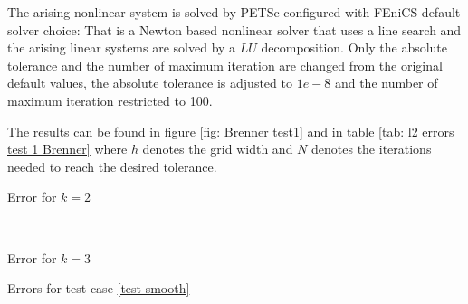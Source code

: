The arising nonlinear system is solved by PETSc configured with FEniCS default solver choice: That is a Newton based nonlinear solver that uses a line search and the arising linear systems are solved by a $LU$ decomposition.
Only the absolute tolerance and the number of maximum iteration are changed from the original default values, the absolute tolerance is adjusted to $1e-8$ and the number of maximum iteration restricted to 100. 

The results can be found in figure \ref{fig: Brenner test1} and in table \ref{tab: l2 errors test 1 Brenner} where $h$ denotes the grid width and $N$ denotes the iterations needed to reach the desired tolerance. 

\begin{table}[H]
	\begin{subtable}[b]{0.45\textwidth}
		\centering
		\pgfplotstabletypeset[columns={iterations, l2error, h1error,N},
				    every row 0 column 0/.style={set content=init},
		]\MAOneBrennerTwo
    	\caption{Error for $k=2$}
   \end{subtable}
   ~
	\begin{subtable}[b]{0.45\textwidth}
		\centering
		\pgfplotstabletypeset[columns={iterations, l2error, h1error,N},
				    every row 0 column 0/.style={set content=init},
		]\MAOneBrennerThree
 	\caption{Error for $k=3$}
	\end{subtable}
	\caption{Errors for test case \ref{test smooth}}
	\label{tab: l2 errors test 1 Brenner}
\end{table}

